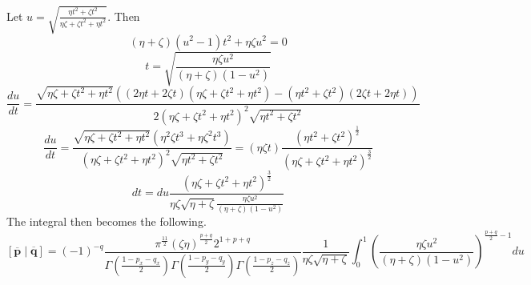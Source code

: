 Let $u = \sqrt{\frac{\eta t^2 + \zeta t^2}{\eta\zeta + \zeta t^2 + \eta t^2}}$. Then
\begin{equation}
  \left(\eta + \zeta\right)\left(u^2 - 1\right) t^2 + \eta\zeta u^2 = 0
\end{equation}
\begin{equation}
  t = \sqrt{\frac{\eta\zeta u^2}{\left(\eta + \zeta\right)\left(1 - u^2\right)}}
\end{equation}
\begin{equation}
  \frac{du}{dt} = \frac{\sqrt{\eta\zeta + \zeta t^2 + \eta t^2}\left(\left(2\eta t + 2\zeta t\right)\left(\eta\zeta + \zeta t^2 + \eta t^2\right) - \left(\eta t^2 + \zeta t^2\right)\left(2\zeta t + 2\eta t\right)\right)}{2\left(\eta\zeta + \zeta t^2 + \eta t^2\right)^2\sqrt{\eta t^2 + \zeta t^2}}
\end{equation}
\begin{equation}
  \frac{du}{dt} = \frac{\sqrt{\eta\zeta + \zeta t^2 + \eta t^2}\left(\eta^2\zeta t^3 + \eta\zeta^2 t^3\right)}{\left(\eta\zeta + \zeta t^2 + \eta t^2\right)^2\sqrt{\eta t^2 + \zeta t^2}} = \left(\eta\zeta t\right)\frac{\left(\eta t^2 + \zeta t^2\right)^{\frac{1}{2}}}{\left(\eta\zeta + \zeta t^2 + \eta t^2\right)^{\frac{3}{2}}}
\end{equation}
\begin{equation}
  dt = du \frac{\left(\eta\zeta + \zeta t^2 + \eta t^2\right)^{\frac{3}{2}}}{\eta\zeta\sqrt{\eta + \zeta}\frac{\eta\zeta u^2}{\left(\eta + \zeta\right)\left(1 - u^2\right)}}
\end{equation}
The integral then becomes the following.
\begin{equation}
  \left[\overline{\mathbf{p}}\middle|\overline{\mathbf{q}}\right] = (-1)^{-q} \frac{\pi^{\frac{11}{2}} \left(\zeta\eta\right)^{\frac{p + q}{2}} 2^{1 + p + q}}{\Gamma\left(\frac{1 - p_x - q_x}{2}\right)\Gamma\left(\frac{1 - p_y - q_y}{2}\right)\Gamma\left(\frac{1 - p_z - q_z}{2}\right)}\frac{1}{\eta\zeta\sqrt{\eta + \zeta}}\int_0^1 \left(\frac{\eta\zeta u^2}{\left(\eta + \zeta\right)\left(1 - u^2\right)}\right)^{\frac{p + q}{2} - 1} du
\end{equation}
